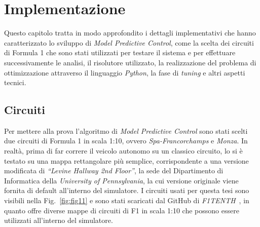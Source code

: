 \chapter{Implementazione}
\label{chap:chap4}
Questo capitolo tratta in modo approfondito i dettagli implementativi
che hanno caratterizzato lo sviluppo di \textit{Model Predictive Control}, come 
la scelta dei circuiti di Formula 1 che sono stati utilizzati per testare il sistema e per 
effettuare successivamente le analisi, il risolutore utilizzato, la realizzazione del problema di 
ottimizzazione attraverso il linguaggio \textit{Python}, la fase di \textit{tuning} e altri aspetti tecnici.

\section{Circuiti}
Per mettere alla prova l'algoritmo di \textit{Model Predictive Control} 
sono stati scelti due circuiti di Formula 1 in scala 1:10, ovvero \textit{Spa-Francorchamps} e \textit{Monza}. 
In realtà, prima di far correre il veicolo autonomo su un classico 
circuito, lo si è testato su una mappa rettangolare più semplice, 
corrispondente a una versione modificata di
\textit{``Levine Hallway 2nd Floor''}, la sede del Dipartimento di 
Informatica della \textit{University of Pennsylvania}, la cui versione originale viene fornita
di default all'interno del simulatore.
I circuiti usati per questa tesi sono visibili nella Fig.~\ref{fig:fig11} 
e sono stati scaricati dal GitHub di \textit{F1TENTH}~\cite{f1tenthtracks}, in quanto offre 
diverse mappe di circuiti di F1 in scala 1:10 che possono essere utilizzati all'interno del simulatore.

